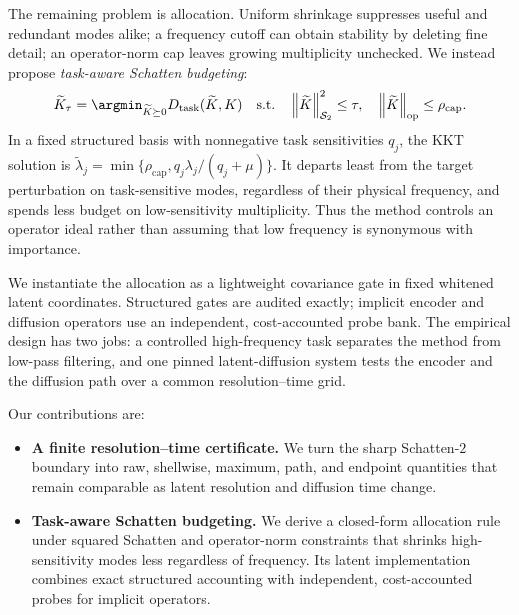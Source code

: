 The remaining problem is allocation. Uniform shrinkage suppresses useful and
redundant modes alike; a frequency cutoff can obtain stability by deleting fine
detail; an operator-norm cap leaves growing multiplicity unchecked. We instead
propose \emph{task-aware Schatten budgeting}:
\begin{equation}
  \widetilde K_\tau
  =\argmin_{\widetilde K\succeq0}
    D_{\mathrm{task}}(\widetilde K,K)
  \quad\text{s.t.}\quad
  \hsnorm{\widetilde K}^{2}\le\tau,
  \quad \opnorm{\widetilde K}\le\rho_{\mathrm{cap}}.
  \label{eq:task-aware-budget-intro}
\end{equation}
In a fixed structured basis with nonnegative task sensitivities $q_j$, the KKT
solution is
$\widetilde\lambda_j=\min\{\rho_{\mathrm{cap}},
q_j\lambda_j/(q_j+\mu)\}$. It departs least
from the target perturbation on task-sensitive modes, regardless of their
physical frequency, and spends less budget on low-sensitivity multiplicity.
Thus the method controls an operator ideal rather than assuming that low
frequency is synonymous with importance.

We instantiate the allocation as a lightweight covariance gate in fixed
whitened latent coordinates. Structured gates are audited exactly; implicit
encoder and diffusion operators use an independent, cost-accounted probe bank.
The empirical design has two jobs: a controlled high-frequency task separates
the method from low-pass filtering, and one pinned latent-diffusion system tests
the encoder and the diffusion path over a common resolution--time grid.

Our contributions are:
\begin{itemize}
  \item \textbf{A finite resolution--time certificate.} We turn the sharp
  Schatten-$2$ boundary into raw, shellwise, maximum, path, and endpoint
  quantities that remain comparable as latent resolution and diffusion time
  change.
  \item \textbf{Task-aware Schatten budgeting.} We derive a closed-form
  allocation rule under squared Schatten and operator-norm constraints that
  shrinks high-sensitivity modes less regardless of frequency. Its latent
  implementation combines exact structured accounting with independent,
  cost-accounted probes for implicit operators.
\end{itemize}

